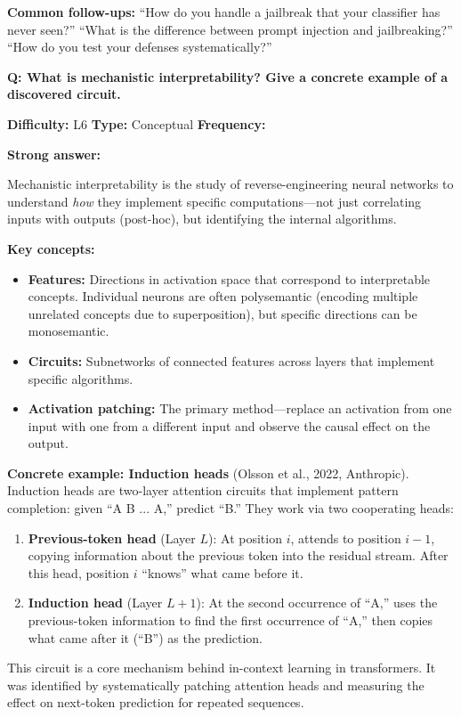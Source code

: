 \begin{interviewq}
\textbf{Common follow-ups:} ``How do you handle a jailbreak that your classifier has never seen?'' ``What is the difference between prompt injection and jailbreaking?'' ``How do you test your defenses systematically?''
\end{interviewq}


\begin{interviewq}
\textbf{Q: What is mechanistic interpretability? Give a concrete example of a discovered circuit.}

\textbf{Difficulty:} L6 \quad \textbf{Type:} Conceptual \quad \textbf{Frequency:} \freqmed{}

\textbf{Strong answer:}

Mechanistic interpretability is the study of reverse-engineering neural networks to understand \textit{how} they implement specific computations---not just correlating inputs with outputs (post-hoc), but identifying the internal algorithms.

\textbf{Key concepts:}
\begin{itemize}
    \item \textbf{Features:} Directions in activation space that correspond to interpretable concepts. Individual neurons are often polysemantic (encoding multiple unrelated concepts due to superposition), but specific directions can be monosemantic.
    \item \textbf{Circuits:} Subnetworks of connected features across layers that implement specific algorithms.
    \item \textbf{Activation patching:} The primary method---replace an activation from one input with one from a different input and observe the causal effect on the output.
\end{itemize}

\textbf{Concrete example: Induction heads} (Olsson et al., 2022, Anthropic). Induction heads are two-layer attention circuits that implement pattern completion: given ``A B ... A,'' predict ``B.'' They work via two cooperating heads:
\begin{enumerate}
    \item \textbf{Previous-token head} (Layer $L$): At position $i$, attends to position $i{-}1$, copying information about the previous token into the residual stream. After this head, position $i$ ``knows'' what came before it.
    \item \textbf{Induction head} (Layer $L{+}1$): At the second occurrence of ``A,'' uses the previous-token information to find the first occurrence of ``A,'' then copies what came after it (``B'') as the prediction.
\end{enumerate}
This circuit is a core mechanism behind in-context learning in transformers. It was identified by systematically patching attention heads and measuring the effect on next-token prediction for repeated sequences.


\end{interviewq}

